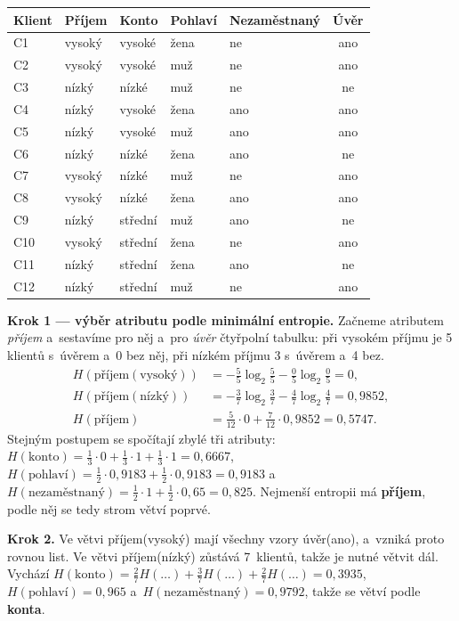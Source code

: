 \documentclass[11pt,a4paper]{article}
\theoremstyle{definition}
\begin{document}
\begin{defbox}
\begin{center}
\small
\begin{tabular}{@{}lllllc@{}}
\toprule
Klient & Příjem & Konto & Pohlaví & Nezaměstnaný & Úvěr \\
\midrule
C1 & vysoký & vysoké & žena & ne & ano \\
C2 & vysoký & vysoké & muž & ne & ano \\
C3 & nízký & nízké & muž & ne & ne \\
C4 & nízký & vysoké & žena & ano & ano \\
C5 & nízký & vysoké & muž & ano & ano \\
C6 & nízký & nízké & žena & ano & ne \\
C7 & vysoký & nízké & muž & ne & ano \\
C8 & vysoký & nízké & žena & ano & ano \\
C9 & nízký & střední & muž & ano & ne \\
C10 & vysoký & střední & žena & ne & ano \\
C11 & nízký & střední & žena & ano & ne \\
C12 & nízký & střední & muž & ne & ano \\
\bottomrule
\end{tabular}
\end{center}

\textbf{Krok 1 --- výběr atributu podle minimální entropie.} Začneme atributem
\emph{příjem} a~sestavíme pro něj a~pro \emph{úvěr} čtyřpolní tabulku: při vysokém příjmu
je 5 klientů s~úvěrem a~0 bez něj, při nízkém příjmu 3 s~úvěrem a~4 bez.
\begin{align*}
H(\text{příjem}(\text{vysoký}))&=-\tfrac55\log_2\tfrac55-\tfrac05\log_2\tfrac05=0,\\
H(\text{příjem}(\text{nízký}))&=-\tfrac37\log_2\tfrac37-\tfrac47\log_2\tfrac47=0{,}9852,\\
H(\text{příjem})&=\tfrac{5}{12}\cdot 0+\tfrac{7}{12}\cdot 0{,}9852=0{,}5747.
\end{align*}
Stejným postupem se spočítají zbylé tři atributy:
$H(\text{konto})=\tfrac13\cdot 0+\tfrac13\cdot 1+\tfrac13\cdot 1=0{,}6667$,
$H(\text{pohlaví})=\tfrac12\cdot 0{,}9183+\tfrac12\cdot 0{,}9183=0{,}9183$
a~$H(\text{nezaměstnaný})=\tfrac12\cdot 1+\tfrac12\cdot 0{,}65=0{,}825$.
Nejmenší entropii má \textbf{příjem}, podle něj se tedy strom větví poprvé.

\textbf{Krok 2.} Ve větvi příjem(vysoký) mají všechny vzory úvěr(ano), a~vzniká proto
rovnou list. Ve větvi příjem(nízký) zůstává 7~klientů, takže je nutné větvit dál. Vychází
$H(\text{konto})=\tfrac27 H(\dots)+\tfrac37 H(\dots)+\tfrac27
H(\dots)=0{,}3935$, $H(\text{pohlaví})=0{,}965$
a~$H(\text{nezaměstnaný})=0{,}9792$, takže se větví podle \textbf{konta}.


\end{defbox}
\end{document}
